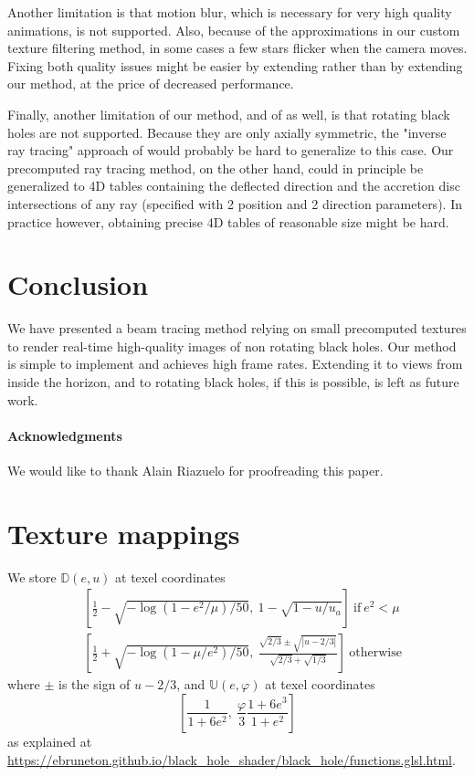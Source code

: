 \documentclass{document}
\begin{document}
Another limitation is that motion blur, which is necessary for very high 
quality animations, is not supported. Also, because of the approximations in 
our custom texture filtering method, in some cases a few stars flicker when the 
camera moves. Fixing both quality issues might be easier by extending 
\cite{Muller2010} rather than by extending our method, at the price of 
decreased performance.

Finally, another limitation of our method, and of \cite{Muller2010} as well, is 
that rotating black holes are not supported. Because they are only axially 
symmetric, the "inverse ray tracing" approach of \cite{Muller2010} would 
probably be hard to generalize to this case. Our precomputed ray tracing 
method, on the other hand, could in principle be generalized to 4D tables 
containing the deflected direction and the accretion disc intersections of any 
ray (specified with 2 position and 2 direction parameters). In practice 
however, obtaining precise 4D tables of reasonable size might be hard.

\section{Conclusion}\label{sec:conclusion}

We have presented a beam tracing method relying on small precomputed textures 
to render real-time high-quality images of non rotating black holes. Our method 
is simple to implement and achieves high frame rates. Extending it to views 
from inside the horizon, and to rotating black holes, if this is possible, is 
left as future work.

\paragraph*{Acknowledgments} We would like to thank Alain Riazuelo for 
proofreading this paper.

\appendix
\section{Texture mappings}\label{sec:texmapping}

We store $\mathbb{D}(e,u)$ at texel coordinates
\begin{equation*}
\begin{split}
&\left[\frac{1}{2} - \sqrt{-\log(1 - e^2 / \mu) / 50},\ 1 - \sqrt{1 - u / 
u_a}\right]\ \mathrm{if}\ e^2 < \mu\\
&\left[\frac{1}{2} + \sqrt{-\log(1 - \mu / e^2) / 50},\ \frac{\sqrt{2/3} \pm 
\sqrt{|u - 2 / 3|}}{\sqrt{2 / 3} + \sqrt{1 / 3}}\right]\ \mathrm{otherwise}
\end{split}
\end{equation*}
where $\pm$ is the sign of $u-2/3$, and $\mathbb{U}(e, \varphi)$ at texel 
coordinates
\begin{equation*}
\left[\frac{1}{1 + 6 e^2},\ \frac{\varphi}{3} \frac{1 + 6 e^3}{1 + e^2}\right]
\end{equation*}
as explained at 
\url{https://ebruneton.github.io/black_hole_shader/black_hole/functions.glsl.html}.
\end{document}
